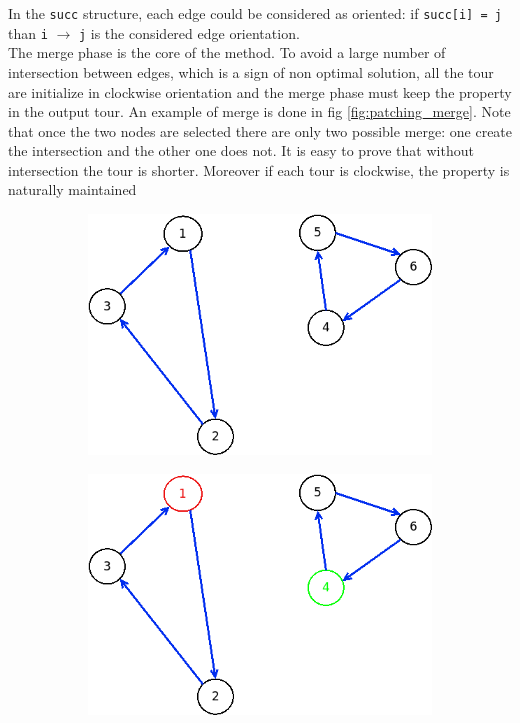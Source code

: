 In the \texttt{succ} structure, each edge could be considered as oriented: if \texttt{succ[i] = j} than \texttt{i} $\rightarrow$ \texttt{j} is the considered edge orientation. \\
The merge phase is the core of the method. To avoid a large number of intersection between edges, which is a sign of non optimal solution, all the tour are initialize in clockwise orientation and the merge phase must keep the property in the output tour. An example of merge is done in fig \ref{fig:patching_merge}. Note that once the two nodes are selected there are only two possible merge: one create the intersection and the other one does not. It is easy to prove that without intersection the tour is shorter. Moreover if each tour is clockwise, the property is naturally maintained
\begin{figure}[!h]
	\begin{subfigure}{.26\columnwidth}
		\includegraphics[width=\columnwidth]{img/patching_merge1.png}
		\caption{}
		\label{fig:patching_merge1}
	\end{subfigure}
	\hfill%
	\begin{subfigure}{.26\columnwidth}
		\includegraphics[width=\columnwidth]{img/patching_merge2.png}

\end{subfigure}
\end{figure}
